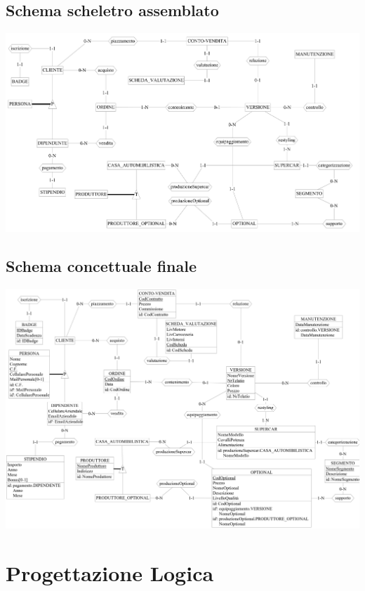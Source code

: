 \documentclass[11pt]{article}
\begin{document}
\subsection{Schema scheletro assemblato}

\begin{center}
    \includegraphics[scale=0.60, angle=90]{images/fullSchemes/scheletro.png}
\end{center}

\newpage

\subsection{Schema concettuale finale}
\begin{center}
    \includegraphics[scale=0.53, angle=90]{images/fullSchemes/finale.jpeg}
\end{center}

\newpage

\section{Progettazione Logica}
\end{document}
